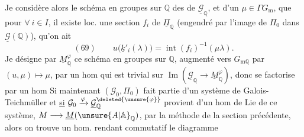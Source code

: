 Je considère alors le schéma en groupes sur $\mathbb Q$ des   de $\underline{\mathcal{G}}_{\mathbb Q}$, et d'un $\mu\in\Gamma G_{\mathrm m}$,  que pour $\forall\ i\in I$,  il existe loc. une section $f_i$ de $\underline{\Pi}_{\mathbb Q}$ (engendré par l'image de $\Pi_0$ dans $\underline{\mathcal{G}}(\mathbb Q)$),  qu'on ait
\[
(69)\qquad u\bigl(\underline{k}'_i(\lambda)\bigr)=\operatorname{int}(f_i)^{-1}(\mu\lambda).
\]
Je désigne par $\underline{M}_{\mathbb Q}^{\varphi}$ ce schéma en groupes sur $\mathbb Q$, augmenté vers $G_{\mathrm m\mathbb Q}$ par $(u,\mu)\longmapsto\mu$, par un hom qui est trivial sur $\operatorname{Im}(\underline{\mathcal{G}}_{\mathbb Q}\to\underline{M}_{\mathbb Q}^{\varphi})$, donc se factorise par un hom
Si maintenant $(\mathcal{G}_0,\Pi_0)$ fait partie d'un système de Galois-Teichmüller
et \uline{si} $\mathcal{G}_0\xrightarrow{\varphi}\underline{\mathcal{G}}_{\mathbb Q}^{\deleted{\unsure{\varphi}}}$ provient d'un hom de Lie de ce système, $M\longrightarrow\underline{M}(\unsure{A|\mathbb{A}}_{\mathbb Q})$, par la méthode de la section précédente, alors on trouve un hom. 
rendant commutatif le diagramme
